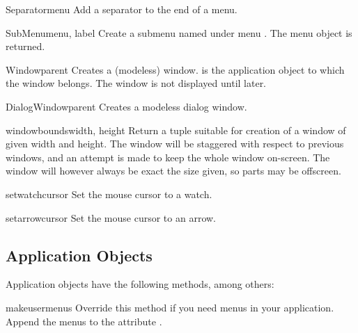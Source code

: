 \begin{funcdesc}{Separator}{menu}
Add a separator to the end of a menu.
\end{funcdesc}

\begin{funcdesc}{SubMenu}{menu, label}
Create a submenu named  under menu . The menu
object is returned.
\end{funcdesc}

\begin{funcdesc}{Window}{parent}
Creates a (modeless) window.  is the application object to
which the window belongs. The window is not displayed until later.
\end{funcdesc}

\begin{funcdesc}{DialogWindow}{parent}
Creates a modeless dialog window.
\end{funcdesc}

\begin{funcdesc}{windowbounds}{width, height}
Return a  tuple suitable for creation
of a window of given width and height. The window will be staggered
with respect to previous windows, and an attempt is made to keep the
whole window on-screen. The window will however always be exact the
size given, so parts may be offscreen.
\end{funcdesc}

\begin{funcdesc}{setwatchcursor}{}
Set the mouse cursor to a watch.
\end{funcdesc}

\begin{funcdesc}{setarrowcursor}{}
Set the mouse cursor to an arrow.
\end{funcdesc}

\subsection{Application Objects}
\label{application-objects}

Application objects have the following methods, among others:


\begin{funcdesc}{makeusermenus}{}
Override this method if you need menus in your application. Append the
menus to the attribute .
\end{funcdesc}

